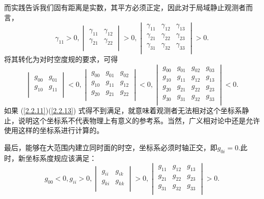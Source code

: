 \documentclass[11pt, a4paper, oneside, onecolumn]{ctexart}
\numberwithin{equation}{subsection}
\begin{document}
而实践告诉我们固有距离是实数，其平方必须正定，因此对于局域静止观测者而言，
\begin{equation}
\gamma_{11}>0,\begin{vmatrix}
\gamma_{11} & \gamma_{12}\\
\gamma_{21} & \gamma_{22}\\
\end{vmatrix}>0,\begin{vmatrix}
\gamma_{11} & \gamma_{12} & \gamma_{13}\\
\gamma_{21} & \gamma_{22} & \gamma_{23}\\
\gamma_{31} & \gamma_{32} & \gamma_{33}\\
\end{vmatrix}>0.
\end{equation}
将其转化为对时空度规的要求，可得
\begin{equation}
\begin{vmatrix}
g_{00} & g_{01}\\
g_{10} & g_{11}\\
\end{vmatrix}<0,
\begin{vmatrix}
g_{00} & g_{01} & g_{02}\\
g_{10} & g_{11} & g_{12}\\
g_{20} & g_{21} & g_{22}\\
\end{vmatrix}<0,
\begin{vmatrix}
g_{00} & g_{01} & g_{02} & g_{03}\\
g_{10} & g_{11} & g_{12} & g_{13}\\
g_{20} & g_{21} & g_{22} & g_{23}\\
g_{30} & g_{31} & g_{32} & g_{33}\\
\end{vmatrix}<0.\label{2.2.13}
\end{equation}
如果 (\ref{2.2.11})(\ref{2.2.13}) 式得不到满足，就意味着观测者无法相对这个坐标系静止，说明这个坐标系不代表物理上有意义的参考系。当然，广义相对论中还是允许使用这样的坐标系进行计算的。

最后，能够在大范围内建立同时面的时空，坐标系必须时轴正交，即$g_{0i}=0$.此时，新坐标系度规应该满足：
\begin{equation}
g_{00}<0,g_{ii}>0,
\begin{vmatrix}
g_{ii} & g_{ik}\\
g_{ki} & g_{kk}\\
\end{vmatrix}>0,
\begin{vmatrix}
g_{11} & g_{12} & g_{13}\\
g_{21} & g_{22} & g_{23}\\
g_{31} & g_{32} & g_{33}\\
\end{vmatrix}>0.
\end{equation}
\end{document}
